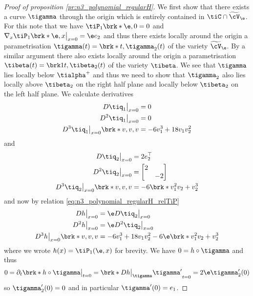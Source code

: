 \begin{proof}[Proof of proposition \ref{pr:n3_polynomial_regularH}]
  We first show that there exists a curve $\tigamma$ through the origin which is
  entirely contained in $\tiC\cap \widetilde{\cV}_\e$.
  For this note that we have $\tiP_1\brk*{\e,0}=0$ and $\nabla_x\tiP_1\brk*{\e,x}\big\vert_{x=0}=\e e_2$
  and thus there exists locally around the origin a parametrisation $\tigamma(t)=\brk*{t,\tigamma_2(t)}$
  of the variety $\widetilde{\cV}_\e$.
  By a similar argument there also exists locally around the origin  a parametrisation $\tibeta(t)=\brk1{t,\tibeta_2(t)}$ of the variety $\tibeta$.
  We see that $\tigamma$ lies locally below $\tialpha^+$ and thus we need to show that $\tigamma_2$ also lies locally
  above $\tibeta_2$ on the right half plane and locally below $\tibeta_2$ on the left half plane.
  We calculate derivatives
  \begin{align*}
    D\tiq_1\big\vert_{x=0}&=0 \\
    D^2\tiq_1\big\vert_{x=0}&=0 \\
    D^3\tiq_1\big\vert_{x=0}\brk*{v,v,v}&=-6v_1^3+18v_1v_2^2
  \end{align*}
  and
  \begin{align*}
    D\tiq_2\big\vert_{x=0}&=2e_2^\top\\
    D^2\tiq_2\big\vert_{x=0}&=\begin{bmatrix}
      2&\\
      &-2
    \end{bmatrix} \\
	    D^3\tiq_2\big\vert_{x=0}\brk*{v,v,v}&=-6\brk*{v_1^2v_2+v_2^3}
  \end{align*}
  and now by relation \eqref{eq:n3_polynomial_regularH_relTiP}
  \begin{align}
    \begin{aligned}
	    Dh\big\vert_{x=0}&=\e D\tiq_2\big\vert_{x=0}\\
	    D^2h\big\vert_{x=0}&=\e D^2\tiq_2\big\vert_{x=0} \\
    D^3h\big\vert_{x=0}\brk*{v,v,v}&=-6v_1^3+18v_1v_2^2-6\e\brk*{v_1^2v_2+v_2^3}
    \end{aligned}
    \label{eq:n3_polynomial_regularH_DPDq}
  \end{align}
  where we wrote $h(x)=\tiP_1(\e,x)$ for brevity. We have $0=h\circ\tigamma$ and thus
  \begin{align}
    0=\partial_t\brk*{h\circ\tigamma}\big\vert_{t=0}=\brk*{Dh\big\vert_{\tigamma}\tigamma'}_{t=0}
    =2\e\tigamma_2'(0)\label{eq:n3_polynomial_regularH_gammaDer1}
  \end{align}
  so $\tigamma_2'(0)=0$ and in particular $\tigamma'(0)=e_1$.

\end{proof}
